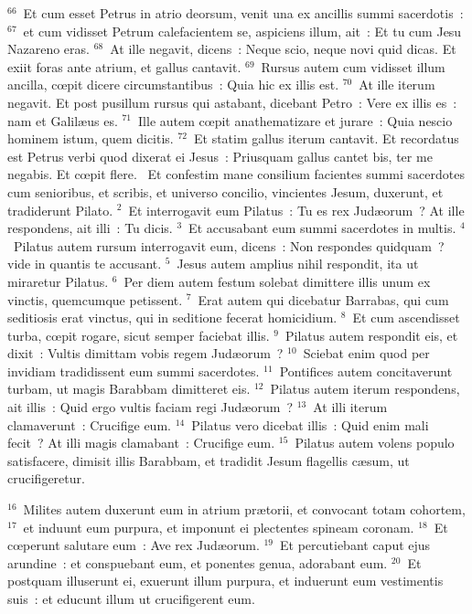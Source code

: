 ${}^{66}$~Et cum esset Petrus in atrio deorsum, venit una ex ancillis summi sacerdotis~:
${}^{67}$~et cum vidisset Petrum calefacientem se, aspiciens illum, ait~: Et tu cum Jesu Nazareno eras.
${}^{68}$~At ille negavit, dicens~: Neque scio, neque novi quid dicas. Et exiit foras ante atrium, et gallus cantavit.
${}^{69}$~Rursus autem cum vidisset illum ancilla, cœpit dicere circumstantibus~: Quia hic ex illis est.
${}^{70}$~At ille iterum negavit. Et post pusillum rursus qui astabant, dicebant Petro~: Vere ex illis es~: nam et Galil\ae us es.
${}^{71}$~Ille autem cœpit anathematizare et jurare~: Quia nescio hominem istum, quem dicitis.
${}^{72}$~Et statim gallus iterum cantavit. Et recordatus est Petrus verbi quod dixerat ei Jesus~: Priusquam gallus cantet bis, ter me negabis. Et cœpit flere.
~\lettrine[lines=10,image=true,loversize=0.05,lraise=-0.03]{E}{}t confestim mane consilium facientes summi sacerdotes cum senioribus, et scribis, et universo concilio, vincientes Jesum, duxerunt, et tradiderunt Pilato.
${}^{2}$~Et interrogavit eum Pilatus~: Tu es rex Jud\ae orum~? At ille respondens, ait illi~: Tu dicis.
${}^{3}$~Et accusabant eum summi sacerdotes in multis.
${}^{4}$~Pilatus autem rursum interrogavit eum, dicens~: Non respondes quidquam~? vide in quantis te accusant.
${}^{5}$~Jesus autem amplius nihil respondit, ita ut miraretur Pilatus.
${}^{6}$~Per diem autem festum solebat dimittere illis unum ex vinctis, quemcumque petissent.
${}^{7}$~Erat autem qui dicebatur Barrabas, qui cum seditiosis erat vinctus, qui in seditione fecerat homicidium.
${}^{8}$~Et cum ascendisset turba, cœpit rogare, sicut semper faciebat illis.
${}^{9}$~Pilatus autem respondit eis, et dixit~: Vultis dimittam vobis regem Jud\ae orum~?
${}^{10}$~Sciebat enim quod per invidiam tradidissent eum summi sacerdotes.
${}^{11}$~Pontifices autem concitaverunt turbam, ut magis Barabbam dimitteret eis.
${}^{12}$~Pilatus autem iterum respondens, ait illis~: Quid ergo vultis faciam regi Jud\ae orum~?
${}^{13}$~At illi iterum clamaverunt~: Crucifige eum.
${}^{14}$~Pilatus vero dicebat illis~: Quid enim mali fecit~? At illi magis clamabant~: Crucifige eum.
${}^{15}$~Pilatus autem volens populo satisfacere, dimisit illis Barabbam, et tradidit Jesum flagellis c\ae sum, ut crucifigeretur.


${}^{16}$~Milites autem duxerunt eum in atrium pr\ae torii, et convocant totam cohortem,
${}^{17}$~et induunt eum purpura, et imponunt ei plectentes spineam coronam.
${}^{18}$~Et cœperunt salutare eum~: Ave rex Jud\ae orum.
${}^{19}$~Et percutiebant caput ejus arundine~: et conspuebant eum, et ponentes genua, adorabant eum.
${}^{20}$~Et postquam illuserunt ei, exuerunt illum purpura, et induerunt eum vestimentis suis~: et educunt illum ut crucifigerent eum.


